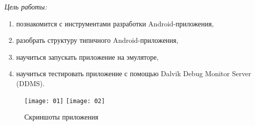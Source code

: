 \documentclass[pscyr,nonums]{hedlab}
\begin{document}
  \makeheader
  \lstset{language=java, basicstyle=\tiny}

  \emph{Цель работы:} 
  \begin{enumerate}
    \item познакомится с инструментами разработки Android-приложения,
    \item разобрать структуру типичного Android-приложения,
    \item научиться запускать приложение на эмуляторе,
    \item научиться тестировать приложение с помощью
      Dalvik Debug Monitor Server (DDMS).
  \end{enumerate}

  \vspace{2em}
  

  \begin{figure}[!ht]
    \center
    \texttt{[image: 01]} \hfill
    \texttt{[image: 02]}
    \caption{Скриншоты приложения}
  \end{figure}
\end{document}
